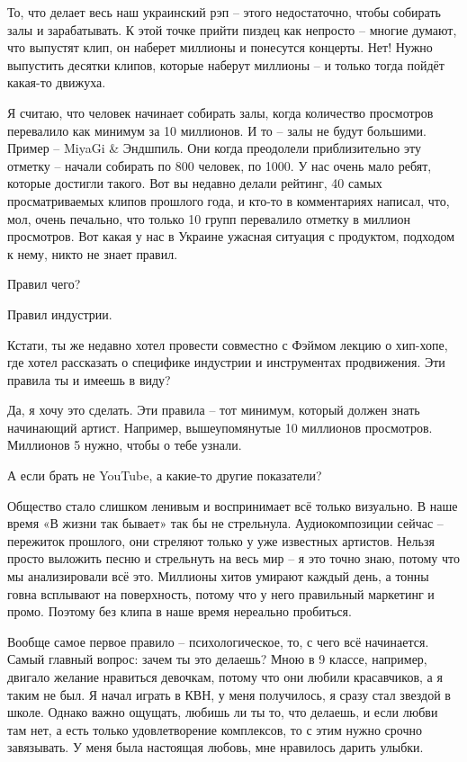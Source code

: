 То, что делает весь наш украинский рэп – этого недостаточно, чтобы собирать залы и зарабатывать. К этой точке прийти пиздец как непросто – многие думают, что выпустят клип, он наберет миллионы и понесутся концерты. Нет! Нужно выпустить десятки клипов, которые наберут миллионы – и только тогда пойдёт какая-то движуха.

Я считаю, что человек начинает собирать залы, когда количество просмотров перевалило как минимум за 10 миллионов. И то – залы не будут большими. Пример – MiyaGi & Эндшпиль. Они когда преодолели приблизительно эту отметку – начали собирать по 800 человек, по 1000. У нас очень мало ребят, которые достигли такого. Вот вы недавно делали рейтинг, 40 самых просматриваемых клипов прошлого года, и кто-то в комментариях написал, что, мол, очень печально, что только 10 групп перевалило отметку в миллион просмотров. Вот какая у нас в Украине ужасная ситуация с продуктом, подходом к нему, никто не знает правил.

Правил чего?

Правил индустрии.

Кстати, ты же недавно хотел провести совместно с Фэймом лекцию о хип-хопе, где
хотел рассказать о специфике индустрии и инструментах продвижения. Эти правила
ты и имеешь в виду?

Да, я хочу это сделать. Эти правила – тот минимум, который должен знать
начинающий артист. Например, вышеупомянутые 10 миллионов просмотров. Миллионов
5 нужно, чтобы о тебе узнали.

А если брать не YouTube, а какие-то другие показатели?

Общество стало слишком ленивым и воспринимает всё только визуально. В наше
время «В жизни так бывает» так бы не стрельнула. Аудиокомпозиции сейчас –
пережиток прошлого, они стреляют только у уже известных артистов. Нельзя просто
выложить песню и стрельнуть на весь мир – я это точно знаю, потому что мы
анализировали всё это. Миллионы хитов умирают каждый день, а тонны говна
всплывают на поверхность, потому что у него правильный маркетинг и промо.
Поэтому без клипа в наше время нереально пробиться.

Вообще самое первое правило – психологическое, то, с чего всё начинается. Самый
главный вопрос: зачем ты это делаешь? Мною в 9 классе, например, двигало
желание нравиться девочкам, потому что они любили красавчиков, а я таким не
был. Я начал играть в КВН, у меня получилось, я сразу стал звездой в школе.
Однако важно ощущать, любишь ли ты то, что делаешь, и если любви там нет, а
есть только удовлетворение комплексов, то с этим нужно срочно завязывать. У
меня была настоящая любовь, мне нравилось дарить улыбки.

